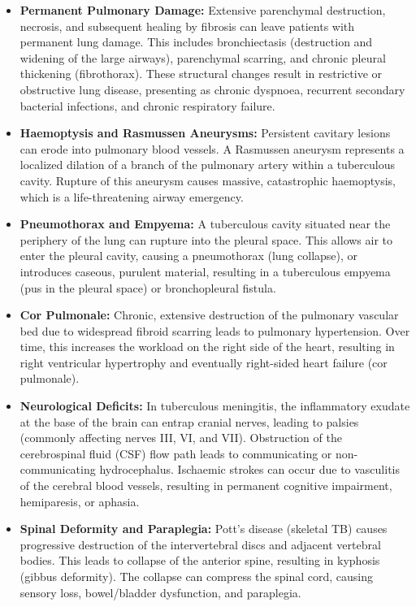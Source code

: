 \begin{itemize}
    \item \textbf{Permanent Pulmonary Damage:} Extensive parenchymal destruction, necrosis, and subsequent healing by fibrosis can leave patients with permanent lung damage. This includes bronchiectasis (destruction and widening of the large airways), parenchymal scarring, and chronic pleural thickening (fibrothorax). These structural changes result in restrictive or obstructive lung disease, presenting as chronic dyspnoea, recurrent secondary bacterial infections, and chronic respiratory failure.
    \item \textbf{Haemoptysis and Rasmussen Aneurysms:} Persistent cavitary lesions can erode into pulmonary blood vessels. A Rasmussen aneurysm represents a localized dilation of a branch of the pulmonary artery within a tuberculous cavity. Rupture of this aneurysm causes massive, catastrophic haemoptysis, which is a life-threatening airway emergency.
    \item \textbf{Pneumothorax and Empyema:} A tuberculous cavity situated near the periphery of the lung can rupture into the pleural space. This allows air to enter the pleural cavity, causing a pneumothorax (lung collapse), or introduces caseous, purulent material, resulting in a tuberculous empyema (pus in the pleural space) or bronchopleural fistula.
    \item \textbf{Cor Pulmonale:} Chronic, extensive destruction of the pulmonary vascular bed due to widespread fibroid scarring leads to pulmonary hypertension. Over time, this increases the workload on the right side of the heart, resulting in right ventricular hypertrophy and eventually right-sided heart failure (cor pulmonale).
    \item \textbf{Neurological Deficits:} In tuberculous meningitis, the inflammatory exudate at the base of the brain can entrap cranial nerves, leading to palsies (commonly affecting nerves III, VI, and VII). Obstruction of the cerebrospinal fluid (CSF) flow path leads to communicating or non-communicating hydrocephalus. Ischaemic strokes can occur due to vasculitis of the cerebral blood vessels, resulting in permanent cognitive impairment, hemiparesis, or aphasia.
    \item \textbf{Spinal Deformity and Paraplegia:} Pott's disease (skeletal TB) causes progressive destruction of the intervertebral discs and adjacent vertebral bodies. This leads to collapse of the anterior spine, resulting in kyphosis (gibbus deformity). The collapse can compress the spinal cord, causing sensory loss, bowel/bladder dysfunction, and paraplegia.

\end{itemize}
